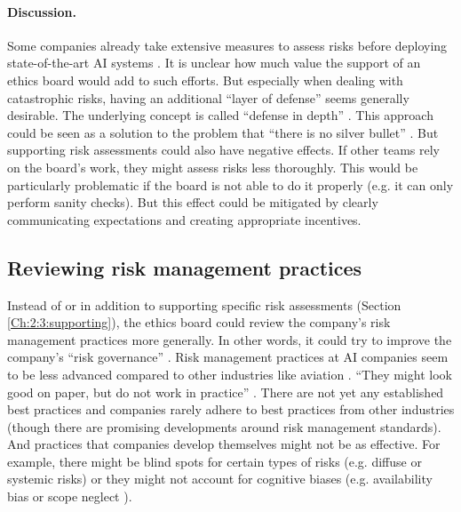 \documentclass{article}
\begin{document}
\paragraph{Discussion.} Some companies already take extensive measures to assess risks before deploying state-of-the-art AI systems \cite{kavukcuoglu2022alphafold, openai2022lessonslearned, anthropic2023coreviews}. It is unclear how much value the support of an ethics board would add to such efforts. But especially when dealing with catastrophic risks, having an additional “layer of defense” seems generally desirable. The underlying concept is called “defense in depth” \cite{cotton2020defence}. This approach could be seen as a solution to the problem that “there is no silver bullet” 
\cite{openai2022lessonslearned}. But supporting risk assessments could also have negative effects. If other teams rely on the board’s work, they might assess risks less thoroughly. This would be particularly problematic if the board is not able to do it properly (e.g. it can only perform sanity checks). But this effect could be mitigated by clearly communicating expectations and creating appropriate incentives.

\subsection{Reviewing risk management practices}\label{Ch:2:4:reviewving}

Instead of or in addition to supporting specific risk assessments (Section \ref{Ch:2:3:supporting}), the ethics board could review the company’s risk management practices more generally. In other words, it could try to improve the company’s “risk governance” \cite{van2011risk, lundqvist2015firms}. Risk management practices at AI companies seem to be less advanced compared to other industries like aviation \cite{hunt2020flight}. “They might look good on paper, but do not work in practice” \cite{schuett2022lines}. There are not yet any established best practices and companies rarely adhere to best practices from other industries (though there are promising developments around risk management standards). And practices that companies develop themselves might not be as effective. For example, there might be blind spots for certain types of risks (e.g. diffuse or systemic risks) or they might not account for cognitive biases (e.g. availability bias or scope neglect \cite{yudkowsky2008cognitive}).
\end{document}
